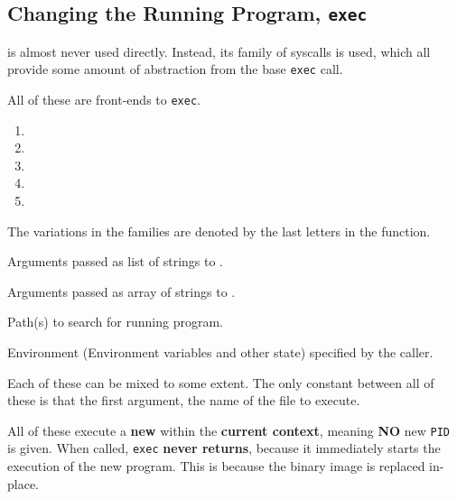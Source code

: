 \subsection{Changing the Running Program, \texttt{exec}}\label{subsec:Change_Running_Program-exec}
 is almost never used directly.
Instead, its family of syscalls is used, which all provide some amount of abstraction from the base \texttt{exec} call.

All of these are front-ends to \texttt{exec}.
\begin{enumerate}[noitemsep]
\item {}
\item {}
\item {}
\item {}
\item {}
\end{enumerate}

The variations in the families are denoted by the last letters in the function.
\begin{description}[noitemsep]
\item[\texttt{l}:] Arguments passed as list of strings to .
\item[\texttt{v}:] Arguments passed as array of strings to .
\item[\texttt{p}:] Path(s) to search for running program.
\item[\texttt{e}:] Environment (Environment variables and other state) specified by the caller.
\end{description}

Each of these can be mixed to some extent.
The only constant between all of these is that the first argument, the name of the file to execute.

All of these execute a \textbf{new } within the \textbf{current  context}, meaning \textbf{NO} new \texttt{PID} is given.
When called, \texttt{exec} \textbf{never returns}, because it immediately starts the execution of the new program.
This is because the binary image is replaced in-place.



